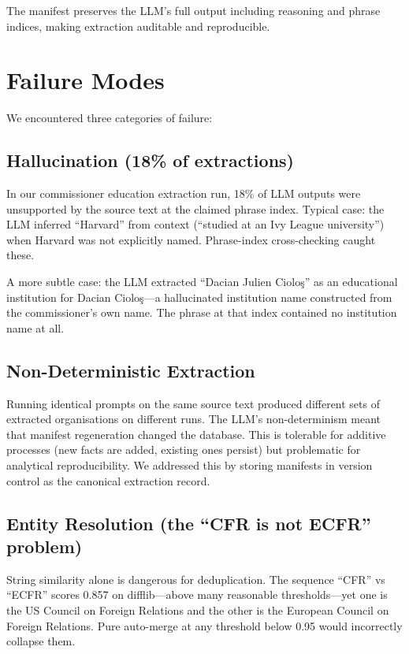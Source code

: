 \documentclass[11pt,a4paper]{article}
\begin{document}
The manifest preserves the LLM's full output including reasoning and phrase indices, making extraction auditable and reproducible.

\section{Failure Modes}

We encountered three categories of failure:

\subsection{Hallucination (18\% of extractions)}

In our commissioner education extraction run, 18\% of LLM outputs were unsupported by the source text at the claimed phrase index. Typical case: the LLM inferred ``Harvard'' from context (``studied at an Ivy League university'') when Harvard was not explicitly named. Phrase-index cross-checking caught these.

A more subtle case: the LLM extracted ``Dacian Julien Ciolo\c{s}'' as an educational institution for Dacian Ciolo\c{s}---a hallucinated institution name constructed from the commissioner's own name. The phrase at that index contained no institution name at all.

\subsection{Non-Deterministic Extraction}

Running identical prompts on the same source text produced different sets of extracted organisations on different runs. The LLM's non-determinism meant that manifest regeneration changed the database. This is tolerable for additive processes (new facts are added, existing ones persist) but problematic for analytical reproducibility. We addressed this by storing manifests in version control as the canonical extraction record.

\subsection{Entity Resolution (the ``CFR is not ECFR'' problem)}

String similarity alone is dangerous for deduplication. The sequence ``CFR'' vs ``ECFR'' scores 0.857 on difflib---above many reasonable thresholds---yet one is the US Council on Foreign Relations and the other is the European Council on Foreign Relations. Pure auto-merge at any threshold below 0.95 would incorrectly collapse them.
\end{document}
